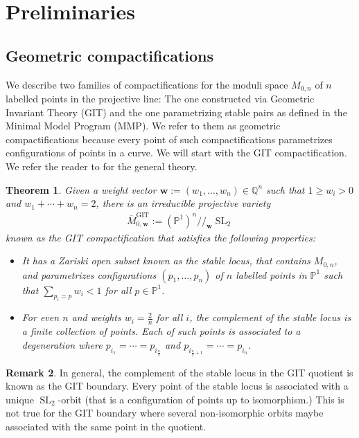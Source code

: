 \documentclass[12pt, letterpaper]{amsart}
\theoremstyle{plain}
\newtheorem{theorem}{Theorem}[section]
\theoremstyle{definition}
\newtheorem{remark}[theorem]{Remark}
\DeclareMathOperator{\SL}{SL}
\begin{document}
\setcounter{tocdepth}{2}
\tableofcontents


\section{Preliminaries}

\subsection{Geometric compactifications}
\label{sec:GeometricCompactifications}
We describe two families of compactifications for the moduli space $M_{0,n}$ of $n$ labelled points in the projective line: The one constructed via Geometric Invariant Theory (GIT) and the one parametrizing stable pairs as defined in the Minimal Model Program (MMP). 
We refer to them as geometric compactifications because every point of such compactifications parametrizes configurations of points in a curve.  We will start with the GIT compactification. We refer the reader to \cite{mumford1994geometric} for the general theory.
\begin{theorem}\cite[Chapter 4.4]{mumford1994geometric}
\label{thm:GITcompactification}
Given a weight vector $\mathbf{w}:=(w_1, \ldots, w_n) \in \mathbb{Q}^n$ such that $1 \geq w_i >0$ and $w_1+ \cdots + w_n=2$, 
there is an irreducible projective variety  
\begin{align*}
\overline{M}_{0,\mathbf{w}}^{\mathrm{GIT}}
:=
(\mathbb{P}^1)^n / \!\! /_{\mathbf{w}} \SL_2
\end{align*}
known as the GIT compactification that satisfies the following properties: 
\begin{itemize}
    \item It has a Zariski open subset known as the stable locus, that  contains $M_{0,n}$, and 
    parametrizes configurations  $(p_1, \ldots, p_n)$ of $n$ labelled points in $\mathbb{P}^1 $ such that  
    $\sum_{p_i =p} w_i < 1$ for all $p \in \mathbb{P}^1$.
    \item  For even $n$ and weights $w_i = \frac{2}{n}$ for all $i$, the complement of the stable locus is a finite collection of points. Each of such points is associated to a degeneration where $p_{i_1} = \cdots = p_{i_{\frac{n}{2}}}$ and 
    $p_{i_{\frac{n}{2}+1}}= \cdots =  p_{i_n}$.
\end{itemize}
\end{theorem}
\begin{remark}
In general, the complement of the stable locus in the GIT quotient is known as 
the GIT boundary.  Every point of the stable locus is associated with a unique $\SL_2$-orbit (that is a configuration of points up to isomorphism.) This is not true for the GIT boundary where several non-isomorphic orbits maybe associated with the same point in the quotient.
\end{remark}
\end{document}
